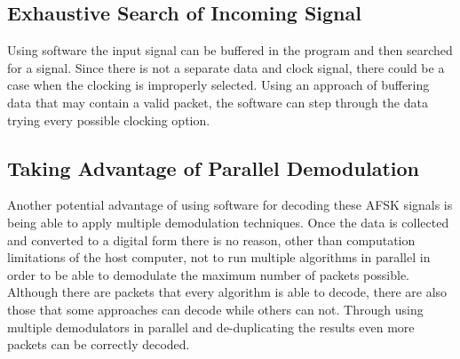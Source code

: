 \subsection{Exhaustive Search of Incoming Signal}
Using software the input signal can be buffered in the program and then searched for a signal. Since there is not a separate data and clock signal, there could be a case when the clocking is improperly selected. Using an approach of buffering data that may contain a valid packet, the software can step through the data trying every possible clocking option.

\subsection{Taking Advantage of Parallel Demodulation}
Another potential advantage of using software for decoding these AFSK signals is being able to apply multiple demodulation techniques. Once the data is collected and converted to a digital form there is no reason, other than computation limitations of the host computer, not to run multiple algorithms in parallel in order to be able to demodulate the maximum number of packets possible. Although there are packets that every algorithm is able to decode, there are also those that some approaches can decode while others can not. Through using multiple demodulators in parallel and de-duplicating the results even more packets can be correctly decoded.
